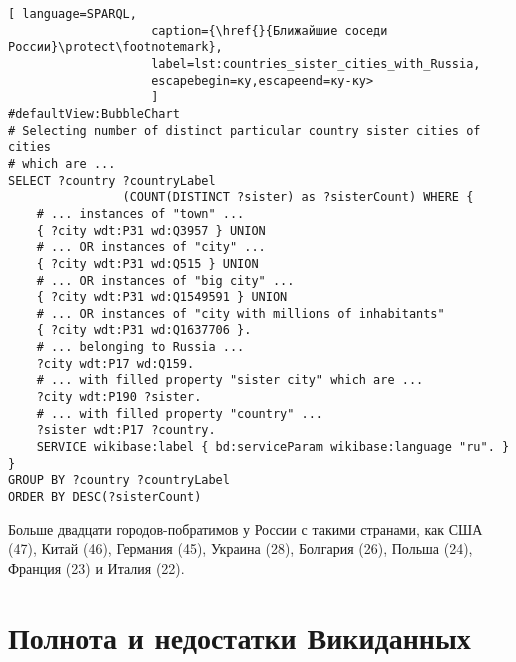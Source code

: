 \begin{lstlisting}[ language=SPARQL, 
                    caption={\href{}{Ближайшие соседи России}\protect\footnotemark},
                    label=lst:countries_sister_cities_with_Russia, 
                    escapebegin=ку,escapeend=ку-ку>
                    ]
#defaultView:BubbleChart
# Selecting number of distinct particular country sister cities of cities 
# which are ...
SELECT ?country ?countryLabel 
				(COUNT(DISTINCT ?sister) as ?sisterCount) WHERE {  
	# ... instances of "town" ...                                                                
	{ ?city wdt:P31 wd:Q3957 } UNION
	# ... OR instances of "city" ...                                     
	{ ?city wdt:P31 wd:Q515 } UNION 
	# ... OR instances of "big city" ...                                     
	{ ?city wdt:P31 wd:Q1549591 } UNION 
	# ... OR instances of "city with millions of inhabitants"                                 
	{ ?city wdt:P31 wd:Q1637706 }.    
	# ... belonging to Russia ...                                   
	?city wdt:P17 wd:Q159.  
	# ... with filled property "sister city" which are ...                                            
	?city wdt:P190 ?sister.   
	# ... with filled property "country" ...                                           
	?sister wdt:P17 ?country.                                            
	SERVICE wikibase:label { bd:serviceParam wikibase:language "ru". }
}
GROUP BY ?country ?countryLabel
ORDER BY DESC(?sisterCount)
\end{lstlisting}

Больше двадцати городов-побратимов у России с такими странами, как США (47), Китай (46), Германия (45), Украина (28), Болгария (26), Польша (24), Франция (23) и Италия (22).

\section{Полнота и недостатки Викиданных}


